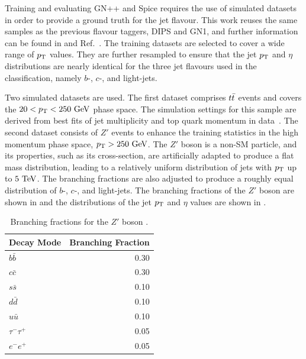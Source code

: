 Training and evaluating \Gls{GN++} and Spice requires the use of simulated datasets in order to provide a ground truth for the jet flavour.
This work reuses the same samples as the previous flavour taggers, DIPS and \Gls{GN1}, and further information can be found in \textcite{AlexThesis} and Ref.~\cite{GN1}.
The training datasets are selected to cover a wide range of $p_\mathrm{T}$ values.
They are further resampled to ensure that the jet $p_\mathrm{T}$ and $\eta$ distributions are nearly identical for the three jet flavours used in the classification, namely $b$-, $c$-, and light-jets.

Two simulated datasets are used.
The first dataset comprises $t\bar{t}$ events and covers the $20 < \pt < 250~\GeV$ phase space.
The simulation settings for this sample are derived from best fits of jet multiplicity and top quark momentum in data~\cite{ttbar1, ttbar2}.
The second dataset consists of $Z'$ events to enhance the training statistics in the high momentum phase space, $\pt > 250~\GeV$.
The $Z'$ boson is a non-SM particle, and its properties, such as its cross-section, are artificially adapted to produce a flat mass distribution, leading to a relatively uniform distribution of jets with $p_\mathrm{T}$ up to $5~\TeV$.
The branching fractions are also adjusted to produce a roughly equal distribution of $b$-, $c$-, and light-jets.
The branching fractions of the $Z'$ boson are shown in  and the distributions of the jet $p_\mathrm{T}$ and $\eta$ values are shown in .

\begin{table}[ht]
    \centering
    \begin{tabular}{lr}
        \toprule
        Decay Mode     & Branching Fraction \\
        \midrule
        $b\bar{b}$     & 0.30               \\
        $c\bar{c}$     & 0.30               \\
        $s\bar{s}$     & 0.10               \\
        $d\bar{d}$     & 0.10               \\
        $u\bar{u}$     & 0.10               \\
        $\tau^-\tau^+$ & 0.05               \\
        $e^-e^+$       & 0.05               \\
        \bottomrule
    \end{tabular}
    \caption{Branching fractions for the $Z'$ boson \cite{Run2FTAlgs}.}
    \label{tab:zprime_branching}
\end{table}

